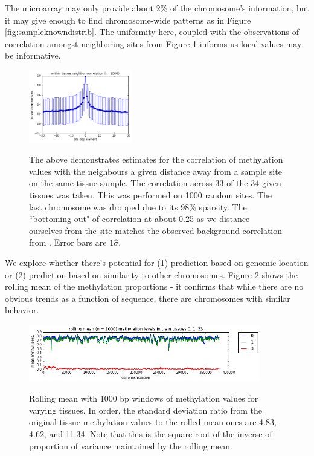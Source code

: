 \documentclass{article} %
\begin{document}
The microarray may only provide about 2\% of the chromosome's information, but it may give enough to find chromosome-wide patterns as in Figure \ref{fig:sampleknowndistrib}. The uniformity here, coupled with the observations of correlation amongst neighboring sites from Figure \ref{fig:colocalsite} informs us local values may be informative.

\begin{figure}[H]
    \centering
    \includegraphics[width=0.4\textwidth]{colocalisitecorr.png}
    \label{fig:colocalsite}
    \caption{The above demonstrates estimates for the correlation of methylation values with the neighbours a given distance away from a sample site on the same tissue sample. The correlation across 33 of the 34 given tissues was taken. This was performed on 1000 random sites. The last chromosome was dropped due to its 98\% sparsity. The ``bottoming out" of correlation at about 0.25 as we distance ourselves from the site matches the observed background correlation from \cite{zhang2015predicting}. Error bars are $1\hat{\sigma}$.}
\end{figure}

We explore whether there's potential for (1) prediction based on genomic location or (2) prediction based on similarity to other chromosomes. Figure \ref{fig:genomictrends} shows the rolling mean of the methylation proportions - it confirms that while there are no obvious trends as a function of sequence, there are chromosomes with similar behavior.

\begin{figure}[H]
    \centering
    \includegraphics[width=0.9\textwidth]{genomictrends.png}
    \label{fig:genomictrends}
    \caption{Rolling mean with 1000 bp windows of methylation values for varying tissues. In order, the standard deviation ratio from the original tissue methylation values to the rolled mean ones are 4.83, 4.62, and 11.34. Note that this is the square root of the inverse of proportion of variance maintained by the rolling mean.}
\end{figure}
\end{document}
